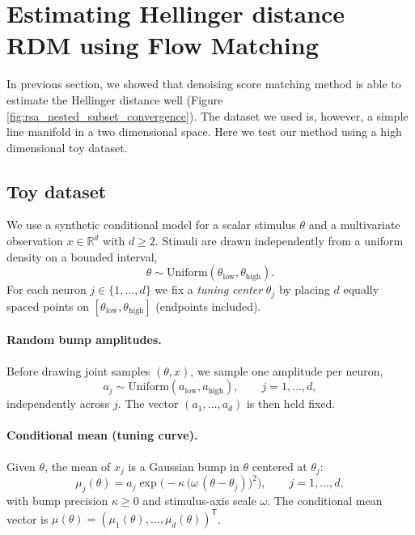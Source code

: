 \section{Estimating Hellinger distance RDM using Flow Matching}

In previous section, we showed that denoising score matching method is able to estimate the Hellinger distance well (Figure \ref{fig:rsa_nested_subset_convergence}). The dataset we used is, however, a simple line manifold in a two dimensional space. Here we test our method using a high dimensional toy dataset.

\subsection{Toy dataset}

We use a synthetic conditional model for a scalar stimulus $\theta$ and a multivariate observation $x \in \mathbb{R}^{d}$ with $d \ge 2$.
Stimuli are drawn independently from a uniform density on a bounded interval,
\begin{equation}
  \theta \sim \mathrm{Uniform}(\theta_{\mathrm{low}}, \theta_{\mathrm{high}}).
\end{equation}
For each neuron $j \in \{1,\ldots,d\}$ we fix a \emph{tuning center} $\theta_j$ by placing $d$ equally spaced points on $[\theta_{\mathrm{low}}, \theta_{\mathrm{high}}]$ (endpoints included).

\paragraph{Random bump amplitudes.}
Before drawing joint samples $(\theta, x)$, we sample one amplitude per neuron,
\begin{equation}
  a_j \sim \mathrm{Uniform}(a_{\mathrm{low}}, a_{\mathrm{high}}),
  \qquad j = 1,\ldots,d,
\end{equation}
independently across $j$.
The vector $(a_1,\ldots,a_d)$ is then held fixed.

\paragraph{Conditional mean (tuning curve).}
Given $\theta$, the mean of $x_j$ is a Gaussian bump in $\theta$ centered at $\theta_j$:
\begin{equation}
  \mu_j(\theta) = a_j \exp\!\bigl(-\kappa\,\bigl(\omega\,(\theta - \theta_j)\bigr)^2\bigr),
  \qquad j = 1,\ldots,d,
\end{equation}
with bump precision $\kappa \ge 0$ and stimulus-axis scale $\omega$.
The conditional mean vector is $\mu(\theta) = (\mu_1(\theta),\ldots,\mu_d(\theta))^{\mathsf{T}}$.

